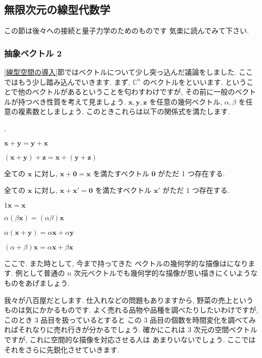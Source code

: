 \documentclass[openany, a4paper, oneside]{jsbook}
\newcounter{enum2}
\renewenvironment{enumerate}{%
\begin{list}%
{%
\arabic{enum2}.\ \,%
}%
{%
\usecounter{enum2}
\setlength{\itemindent}{0pt}%
\setlength{\leftmargin}{15pt}%
\setlength{\rightmargin}{0pt}%
\setlength{\labelsep}{0pt}%
\setlength{\labelwidth}{6pt}%
\setlength{\itemsep}{0pt}%
\setlength{\parsep}{0pt}%
\setlength{\listparindent}{0pt}%
}
}{%
\end{list}%
}
\theoremstyle{break}
\theoremstyle{breakdefn}
\newcommand{\bC}{\mathbb{C}}
\begin{document}
\subsection{無限次元の線型代数学}


この節は後々への接続と量子力学のためのものです
気楽に読んでみて下さい.
\subsubsection{抽象ベクトル 2}


\ref{線型空間の導入}節ではベクトルについて少し突っ込んだ議論をしました.
ここではもう少し踏み込んでいきます.
まず,  $\bC^n$ のベクトルをといいます.
ということで他のベクトルがあるということを匂わすわけですが,
その前に一般のベクトルが持つべき性質を考えて見ましょう.
 $\bm{x},\bm{y},\bm{z}$ を任意の幾何ベクトル,  $\alpha, \beta$ を任意の複素数としましょう.
このときこれらは以下の関係式を満たします.
    \begin{enumerate}
        \item  $\bm{x} + \bm{y} = \bm{y} + \bm{x}$
        \item  $(\bm{x} + \bm{y} ) + \bm{z} = \bm{x} + ( \bm{y} + \bm{z})$
        \item 全ての $\bm{x}$ に対し,  $\bm{x} + \bm{0} = \bm{x}$ を満たすベクトル $\bm{0}$ がただ 1 つ存在する.
        \item 全ての $\bm{x}$ に対し,  $\bm{x} + \bm{x}' = \bm{0}$ を満たすベクトル $\bm{x}'$ がただ 1 つ存在する.
        \item  $1\bm{x} = \bm{x}$
        \item  $\alpha (\beta \bm{x}) = (\alpha \beta) \bm{x}$
        \item  $\alpha (\bm{x} + \bm{y} ) = \alpha \bm{x} + \alpha \bm{y}$
        \item  $(\alpha + \beta ) \bm{x} = \alpha \bm{x} + \beta \bm{x}$
    \end{enumerate}

ここで. また時として, 今まで持ってきた
ベクトルの幾何学的な描像はになります.
例として普通の $n$ 次元ベクトルでも幾何学的な描像が思い描きにくいようなものをあげましょう.

我々が八百屋だとします. 仕入れなどの問題もありますから, 野菜の売上というものは気にかかるものです.
よく売れる品物や品種を調べたりしたいわけですが, このとき $3$ 品目を扱っているとすると
この $3$ 品目の個数を時間変化を調べてみればそれなりに売れ行きが分かるでしょう.
確かにこれは $3$ 次元の空間ベクトルですが, これに空間的な描像を対応させる人は
あまりいないでしょう.
ここではそれをさらに先鋭化させていきます.
\end{document}
